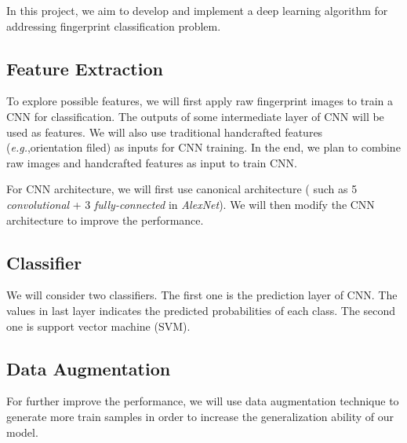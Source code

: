 
In this project, we aim to develop and implement a deep learning algorithm for addressing fingerprint classification problem.

\subsection{Feature Extraction}
%
To explore possible features, we will first apply raw fingerprint images to train a CNN for classification. The outputs of some intermediate layer  of CNN will be used as features.
%
We will also use traditional handcrafted features (\textit{e.g.},orientation filed) as inputs for CNN training. 
%
In the end, we plan to combine raw images and handcrafted features as input to train CNN.

For CNN architecture, we will first use canonical architecture ( such as 5 \textit{convolutional} + 3 \textit{fully-connected} in \textit{AlexNet}\cite{krizhevsky2012imagenet}). We will then modify the CNN architecture to improve the performance.
%

\subsection{Classifier}
%
We will consider two classifiers. The first one is the prediction layer of CNN. The values in last layer indicates the predicted probabilities of each class.
%
The second one is support vector machine (SVM).

\subsection{Data Augmentation}
%
For further improve the performance, we will use data augmentation technique to generate more train samples in order to increase the generalization ability of our model.